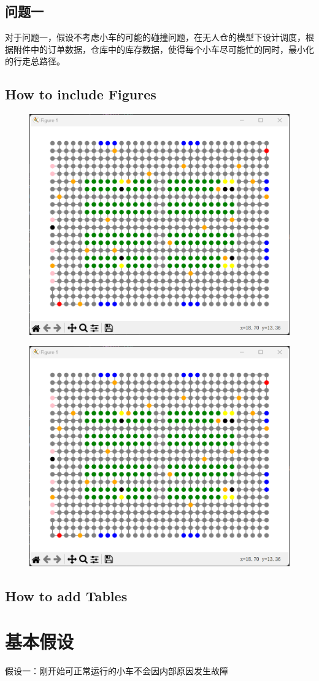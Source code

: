 \documentclass{article}
\begin{document}
\subsection{问题一}
对于问题一，假设不考虑小车的可能的碰撞问题，在无人仓的模型下设计调度，根据附件中的订单数据，仓库中的库存数据，使得每个小车尽可能忙的同时，最小化的行走总路径。

\subsection{How to include Figures}



\begin{figure}
\centering
\includegraphics[width=0.50\linewidth]{mapAGV.png}
\caption{\label{fig:frog}}
\end{figure}

\begin{figure}
	\centering
	\includegraphics[width=0.50\linewidth]{map.png}
	\caption{\label{}}
\end{figure}

\subsection{How to add Tables}


\section{基本假设}
假设一：刚开始可正常运行的小车不会因内部原因发生故障
\end{document}
